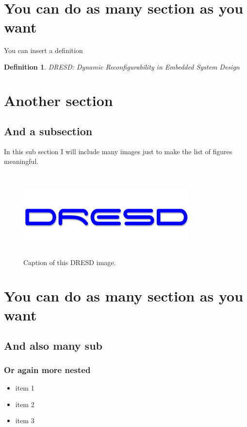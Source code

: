 \documentclass[a4paper,12pt]{article}
\newtheorem{Definition}{Definition}[section]
\begin{document}

\section{You can do as many section as you want}
You can insert a definition
	\begin{Definition}
		DRESD: Dynamic Reconfigurability in Embedded System Design
	\end{Definition}
	
\newpage

\section{Another section}
	\subsection{And a subsection}
		In this sub section I will include many images just to make the list of figures meaningful.

			\begin{figure}[h!tb]
				\centerline {\includegraphics[width=9cm,height=4.5cm]{img/scritta.png}}
				\caption{Caption of this DRESD image.}
				\label{fig:leet}
			\end{figure}

\newpage

\section{You can do as many section as you want}
	\subsection{And also many sub}
		\subsubsection{Or again more nested}
			\begin{itemize}
				\item item 1
				\item item 2
				\item item 3
			\end{itemize}			
\end{document}
